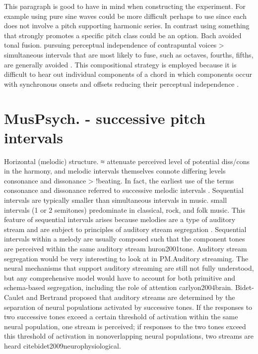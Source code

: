 This paragraph is good to have in mind when constructing the experiment. For example using pure sine waves could be more difficult perhaps to use since each does not involve a pitch supporting harmonic series. In contrast using something that strongly promotes a specific pitch class could be an option.
Bach avoided tonal fusion. pursuing perceptual independence of contrapuntal voices > simultaneous intervals that are most likely to fuse, such as octaves, fourths, fifths, are generally avoided \cite{huron1991tonal} \cite{huron2008asynchronous}. This compositional strategy is employed because it is difficult to hear out individual components of a chord in which components occur with synchronous onsets and offsets reducing their perceptual independence \cite{demany2005binding}.

\section{MusPsych. - successive pitch intervals}
Horizontal (melodic) structure. ≈ attenuate perceived level of potential diss/cons in the harmony, and melodic intervals themselves connote differing levels consonance and dissonance > !beating. In fact, the earliest use of the terms consonance and dissonance referred to successive melodic intervals \cite{plantinga2014revisiting}.
Sequential intervals are typically smaller than simultaneous intervals in music. small intervals (1 or 2 semitones) predominate in classical, rock, and folk music. This feature of sequential intervals arises because melodies are a type of auditory stream and are subject to principles of auditory stream segregation \cite{bregman1994auditory}. Sequential intervals within a melody are usually composed such that the component tones are perceived within the same auditory stream {huron2001tone}. Auditory stream segregation would be very interesting to look at in PM.Auditory streaming. The neural mechanisms that support auditory streaming are still not fully understood, but any comprehensive model would have to account for both primitive and schema-based segregation, including the role of attention {carlyon2004brain}. Bidet-Caulet and Bertrand proposed that auditory streams are determined by the separation of neural populations activated by successive tones. If the responses to two successive tones exceed a certain threshold of activation within the same neural population, one stream is perceived; if responses to the two tones exceed this threshold of activation in nonoverlapping neural populations, two streams are heard cite{bidet2009neurophysiological}.
